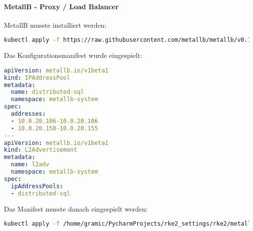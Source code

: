\paragraph{MetallB - Proxy / Load Balancer}
MetallB musste installiert werden:
\lstset{style=gra_codestyle}
\begin{lstlisting}[language=bash, caption=MetallB installieren,captionpos=b,label={lst:metallb-install},breaklines=true]
kubectl apply -f https://raw.githubusercontent.com/metallb/metallb/v0.14.4/config/manifests/metallb-native.yaml
\end{lstlisting}

Das Konfigurationsmanifest wurde eingespielt:
\lstset{style=gra_codestyle}
\begin{lstlisting}[language=yaml, caption=MetallB konfigurieren,captionpos=b,label={lst:metallb-config},breaklines=true]
apiVersion: metallb.io/v1beta1
kind: IPAddressPool
metadata:
  name: distributed-sql
  namespace: metallb-system
spec:
  addresses:
  - 10.0.20.106-10.0.20.106
  - 10.0.20.150-10.0.20.155
---
apiVersion: metallb.io/v1beta1
kind: L2Advertisement
metadata:
  name: l2adv
  namespace: metallb-system
spec:
  ipAddressPools:
  - distributed-sql
\end{lstlisting}

Das Manifest musste danach eingespielt werden:
\lstset{style=gra_codestyle}
\begin{lstlisting}[language=bash, caption=MetallB Konfiguration einspielen,captionpos=b,label={lst:metallb-apply},breaklines=true]
kubectl apply -f /home/gramic/PycharmProjects/rke2_settings/rke2/metallb-values.yaml
\end{lstlisting}

